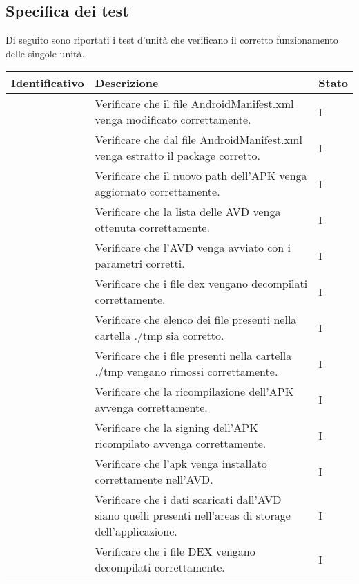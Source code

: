 \subsection{Specifica dei test}\label{subsec:specifica-dei-test-unitari}
Di seguito sono riportati i test d'unità che verificano il corretto funzionamento delle singole unità.
\begin{center}
    \begin{longtable}{ |C{3cm} | C{8.5cm}| C{1.5cm} |}
        \hline
        \textbf{Identificativo} &
        \textbf{Descrizione} &
        \textbf{Stato} \\\hline
         & Verificare che il file AndroidManifest.xml venga modificato correttamente.
        & I \\\hline
         & Verificare che dal file AndroidManifest.xml venga estratto il package corretto.
        & I \\\hline
         & Verificare che il nuovo path dell'APK venga aggiornato correttamente.
        & I \\\hline
         & Verificare che la lista delle AVD venga ottenuta correttamente.
        & I \\\hline
         & Verificare che l'AVD venga avviato con i parametri corretti.
        & I \\\hline
         & Verificare che i file dex vengano decompilati correttamente.
        & I \\\hline
         & Verificare che elenco dei file presenti nella cartella ./tmp sia corretto.
        & I \\\hline
         & Verificare che i file presenti nella cartella ./tmp vengano rimossi correttamente.
        & I \\\hline
         & Verificare che la ricompilazione dell'APK avvenga correttamente.
        & I \\\hline
         & Verificare che la signing dell'APK ricompilato avvenga correttamente.
        & I \\\hline
         & Verificare che l'apk venga installato correttamente nell'AVD.
        & I \\\hline
         & Verificare che i dati scaricati dall'AVD siano quelli presenti nell'areas di storage dell'applicazione.
        & I \\\hline
         & Verificare che i file DEX vengano decompilati correttamente.
        & I \\\hline

\end{longtable}
\end{center}
